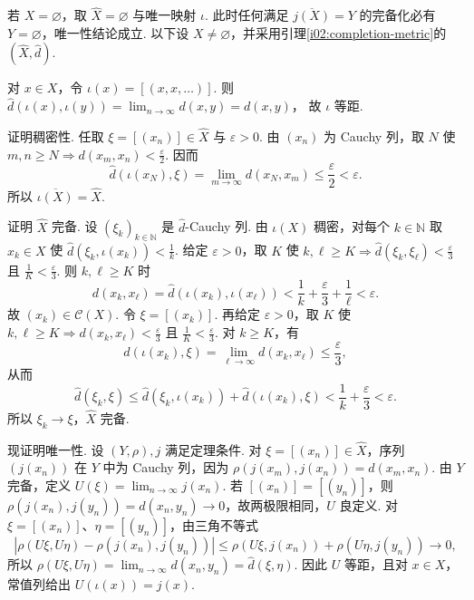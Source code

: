 \begin{FAProof}
若 \(\displaystyle X=\varnothing\)，取 \(\displaystyle \widehat X=\varnothing\) 与唯一映射 \(\displaystyle \iota\). 此时任何满足 \(\displaystyle \overline{j(X)}=Y\) 的完备化必有 \(\displaystyle Y=\varnothing\)，唯一性结论成立. 以下设 \(\displaystyle X\neq\varnothing\)，并采用引理\ref{i02:completion-metric}的 \(\displaystyle (\widehat X,\widehat d)\).

对 \(\displaystyle x\in X\)，令 \(\displaystyle \iota(x)=[(x,x,\dots)]\). 则
\(\displaystyle \widehat d(\iota(x),\iota(y))=\lim_{n\to\infty}d(x,y)=d(x,y)\)，
故 \(\displaystyle \iota\) 等距.

证明稠密性. 任取 \(\displaystyle \xi=[(x_n)]\in\widehat X\) 与 \(\displaystyle \varepsilon>0\). 由 \(\displaystyle (x_n)\) 为 Cauchy 列，取 \(\displaystyle N\) 使 \(\displaystyle m,n\geqslant N\Rightarrow d(x_m,x_n)<\frac{\varepsilon}{2}\). 因而
\[
\widehat d(\iota(x_N),\xi)=\lim_{m\to\infty}d(x_N,x_m)\leqslant\frac{\varepsilon}{2}<\varepsilon.
\]
所以 \(\displaystyle \overline{\iota(X)}=\widehat X\).

证明 \(\displaystyle \widehat X\) 完备. 设 \(\displaystyle (\xi_k)_{k\in\mathbb N}\) 是 \(\displaystyle \widehat d\)-Cauchy 列. 由 \(\displaystyle \iota(X)\) 稠密，对每个 \(\displaystyle k\in\mathbb N\) 取 \(\displaystyle x_k\in X\) 使
\(\displaystyle \widehat d(\xi_k,\iota(x_k))<\frac{1}{k}\).
给定 \(\displaystyle \varepsilon>0\)，取 \(\displaystyle K\) 使 \(\displaystyle k,\ell\geqslant K\Rightarrow\widehat d(\xi_k,\xi_\ell)<\frac{\varepsilon}{3}\) 且 \(\displaystyle \frac{1}{K}<\frac{\varepsilon}{3}\). 则 \(\displaystyle k,\ell\geqslant K\) 时
\[
d(x_k,x_\ell)=\widehat d(\iota(x_k),\iota(x_\ell))
<\frac1k+\frac\varepsilon3+\frac1\ell<\varepsilon.
\]
故 \(\displaystyle (x_k)\in\mathcal C(X)\). 令 \(\displaystyle \xi=[(x_k)]\). 再给定 \(\displaystyle \varepsilon>0\)，取 \(\displaystyle K\) 使 \(\displaystyle k,\ell\geqslant K\Rightarrow d(x_k,x_\ell)<\frac{\varepsilon}{3}\) 且 \(\displaystyle \frac{1}{K}<\frac{\varepsilon}{3}\). 对 \(\displaystyle k\geqslant K\)，有
\[
\widehat d(\iota(x_k),\xi)=\lim_{\ell\to\infty}d(x_k,x_\ell)\leqslant\frac{\varepsilon}{3},
\]
从而
\[
\widehat d(\xi_k,\xi)
\leqslant\widehat d(\xi_k,\iota(x_k))+\widehat d(\iota(x_k),\xi)
<\frac1k+\frac\varepsilon3<\varepsilon.
\]
所以 \(\displaystyle \xi_k\to\xi\)，\(\displaystyle \widehat X\) 完备.

现证明唯一性. 设 \(\displaystyle (Y,\rho),j\) 满足定理条件. 对 \(\displaystyle \xi=[(x_n)]\in\widehat X\)，序列 \(\displaystyle (j(x_n))\) 在 \(\displaystyle Y\) 中为 Cauchy 列，因为
\(\displaystyle \rho(j(x_m),j(x_n))=d(x_m,x_n)\).
由 \(\displaystyle Y\) 完备，定义 \(\displaystyle U(\xi)=\lim_{n\to\infty}j(x_n)\).
若 \(\displaystyle [(x_n)]=[(y_n)]\)，则 \(\displaystyle \rho(j(x_n),j(y_n))=d(x_n,y_n)\to0\)，故两极限相同，\(\displaystyle U\) 良定义. 对 \(\displaystyle \xi=[(x_n)]\)、\(\displaystyle \eta=[(y_n)]\)，由三角不等式
\[
\left|\rho(U\xi,U\eta)-\rho(j(x_n),j(y_n))\right|
\leqslant \rho(U\xi,j(x_n))+\rho(U\eta,j(y_n))\longrightarrow0,
\]
所以 \(\displaystyle \rho(U\xi,U\eta)=\lim_{n\to\infty}d(x_n,y_n)=\widehat d(\xi,\eta)\).
因此 \(\displaystyle U\) 等距，且对 \(\displaystyle x\in X\)，常值列给出 \(\displaystyle U(\iota(x))=j(x)\).


\end{FAProof}
